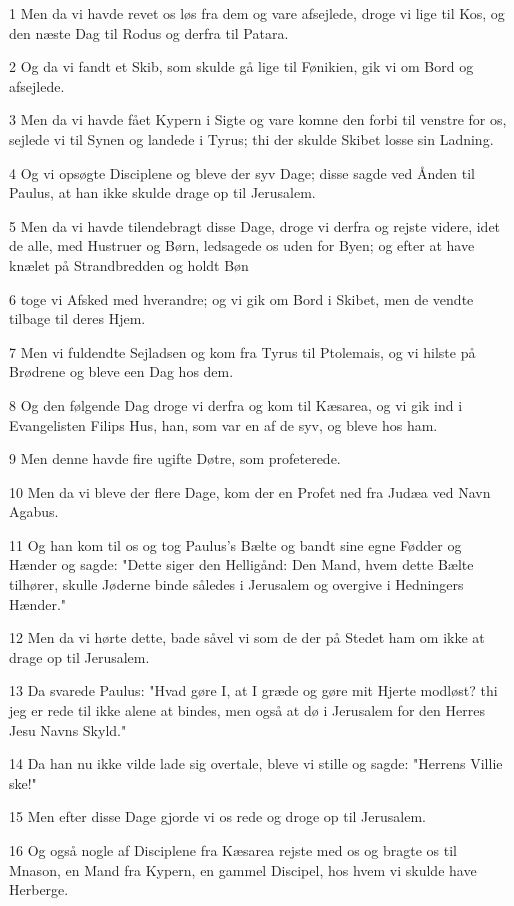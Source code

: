 \par 1 Men da vi havde revet os løs fra dem og vare afsejlede, droge vi lige til Kos, og den næste Dag til Rodus og derfra til Patara.
\par 2 Og da vi fandt et Skib, som skulde gå lige til Fønikien, gik vi om Bord og afsejlede.
\par 3 Men da vi havde fået Kypern i Sigte og vare komne den forbi til venstre for os, sejlede vi til Synen og landede i Tyrus; thi der skulde Skibet losse sin Ladning.
\par 4 Og vi opsøgte Disciplene og bleve der syv Dage; disse sagde ved Ånden til Paulus, at han ikke skulde drage op til Jerusalem.
\par 5 Men da vi havde tilendebragt disse Dage, droge vi derfra og rejste videre, idet de alle, med Hustruer og Børn, ledsagede os uden for Byen; og efter at have knælet på Strandbredden og holdt Bøn
\par 6 toge vi Afsked med hverandre; og vi gik om Bord i Skibet, men de vendte tilbage til deres Hjem.
\par 7 Men vi fuldendte Sejladsen og kom fra Tyrus til Ptolemais, og vi hilste på Brødrene og bleve een Dag hos dem.
\par 8 Og den følgende Dag droge vi derfra og kom til Kæsarea, og vi gik ind i Evangelisten Filips Hus, han, som var en af de syv, og bleve hos ham.
\par 9 Men denne havde fire ugifte Døtre, som profeterede.
\par 10 Men da vi bleve der flere Dage, kom der en Profet ned fra Judæa ved Navn Agabus.
\par 11 Og han kom til os og tog Paulus's Bælte og bandt sine egne Fødder og Hænder og sagde: "Dette siger den Helligånd: Den Mand, hvem dette Bælte tilhører, skulle Jøderne binde således i Jerusalem og overgive i Hedningers Hænder."
\par 12 Men da vi hørte dette, bade såvel vi som de der på Stedet ham om ikke at drage op til Jerusalem.
\par 13 Da svarede Paulus: "Hvad gøre I, at I græde og gøre mit Hjerte modløst? thi jeg er rede til ikke alene at bindes, men også at dø i Jerusalem for den Herres Jesu Navns Skyld."
\par 14 Da han nu ikke vilde lade sig overtale, bleve vi stille og sagde: "Herrens Villie ske!"
\par 15 Men efter disse Dage gjorde vi os rede og droge op til Jerusalem.
\par 16 Og også nogle af Disciplene fra Kæsarea rejste med os og bragte os til Mnason, en Mand fra Kypern, en gammel Discipel, hos hvem vi skulde have Herberge.
